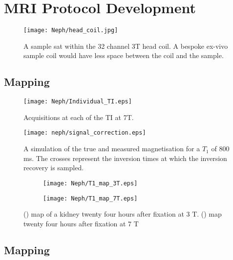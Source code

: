 \section{MRI Protocol Development}

\begin{figure}[H]
	\centering
	\texttt{[image: Neph/head\_coil.jpg]}
	\caption{A sample sat within the 32 channel 3T head coil. A bespoke ex-vivo sample coil would have less space between the coil and the sample.}
	\label{fig:ex_head_coil}	
\end{figure}

\subsection{\tone Mapping}
\begin{figure}[H]
	\centering
	\texttt{[image: Neph/Individual\_TI.eps]}
	\caption{Acquisitions at each of the \ac{TI} at 7T.}
	\label{fig:ex_ir_data}	
\end{figure}
\begin{figure}[H]
	\centering
	\texttt{[image: neph/signal\_correction.eps]}
	\caption{A simulation of the true and measured magnetisation for a $T_1$ of 800 ms. The crosses represent the inversion times at which the inversion recovery is sampled.}
	\label{fig:ex_sig_mag_correction}	
\end{figure}

\begin{figure}[H]
	\centering
	\begin{subfigure}[c]{0.47\textwidth}
		\centering
		\texttt{[image: Neph/T1\_map\_3T.eps]}
		\caption{}
		\label{fig:ex_t1_map_3t}
	\end{subfigure}
	\hfill
	\begin{subfigure}[c]{0.47\textwidth}
		\centering
		\texttt{[image: Neph/T1\_map\_7T.eps]}
		\caption{}
		\label{fig:ex_t1_map_7t}
	\end{subfigure}
	\caption{() \tone map of a kidney twenty four hours after fixation at 3 T. () \tone map twenty four hours after fixation at 7 T  }
	\label{fig:ex_t1_maps}
\end{figure}

\subsection{\ttwo Mapping}


